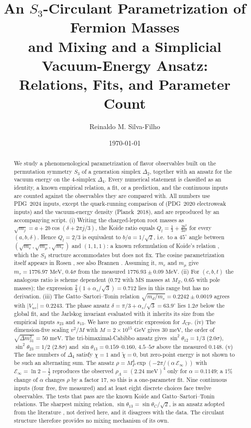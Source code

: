 \documentclass[11pt,reqno]{amsart}
\title[$S_3$-Circulant Flavor Parametrization: Relations, Fits, Parameter Count]{An $S_3$-Circulant Parametrization of Fermion Masses\\ and Mixing and a Simplicial Vacuum-Energy Ansatz:\\ Relations, Fits, and Parameter Count}
\author{Reinaldo M. Silva-Filho}
\date{\today}
\author@andify\authors
\theoremstyle{definition}
\begin{document}
\begin{abstract}
We study a phenomenological parametrization of flavor observables built on the permutation symmetry $S_3$ of a generation simplex $\Delta_2$, together with an ansatz for the vacuum energy on the 4-simplex $\Delta_4$. Every numerical statement is classified as an identity, a known empirical relation, a fit, or a prediction, and the continuous inputs are counted against the observables they are compared with. All numbers use PDG~2024 inputs, except the quark-running comparison of \cite{huang2021precise} (PDG~2020 electroweak inputs) and the vacuum-energy density (Planck~2018), and are reproduced by an accompanying script.
(i) Writing the charged-lepton root masses as $\sqrt{m_j} = a + 2b\cos(\delta + 2\pi j/3)$, the Koide ratio equals $Q_l = \frac13 + \frac{2b^2}{3a^2}$ for every $(a,b,\delta)$. Hence $Q_l = 2/3$ is equivalent to $b/a = 1/\sqrt2$, i.e.\ to a $45^\circ$ angle between $(\sqrt{m_e},\sqrt{m_\mu},\sqrt{m_\tau})$ and $(1,1,1)$: a known reformulation of Koide's relation \cite{foot1994note}, which the $S_3$ structure accommodates but does not fix. The cosine parametrization itself appears in Rosen \cite{rosen2007heuristic}, see also Brannen \cite{brannen2010spin}. Assuming it, $m_e$ and $m_\mu$ give $m_\tau = 1776.97\text{ MeV}$, $0.4\sigma$ from the measured $1776.93 \pm 0.09\text{ MeV}$.
(ii) For $(c,b,t)$ the analogous ratio is scheme dependent ($0.72$ with $\overline{\mathrm{MS}}$ masses at $M_Z$, $0.65$ with pole masses); the expression $\frac23(1+\alpha_s/\sqrt3) = 0.712$ lies in this range but has no derivation.
(iii) The Gatto--Sartori--Tonin relation $\sqrt{m_d/m_s} = 0.2242 \pm 0.0019$ agrees with $|V_{us}| = 0.2243$. The phase ansatz $\delta = \pi/3 + \alpha_s/\sqrt3 = 63.9^\circ$ lies $1.2\sigma$ below the global fit, and the Jarlskog invariant evaluated with it inherits its size from the empirical inputs $s_{23}$ and $s_{13}$. We have no geometric expression for $J_{\mathrm{CP}}$.
(iv) The dimension-five scaling $v^2/M$ with $M = 2\times10^{15}\text{ GeV}$ gives $30\text{ meV}$, the order of $\sqrt{\Delta m^2_{31}} = 50\text{ meV}$. The tri-bimaximal-Cabibbo ansatz gives $\sin^2\theta_{12} = 1/3$ ($2.0\sigma$), $\sin^2\theta_{23} = 1/2$ ($2.8\sigma$) and $\sin\theta_{13} = 0.159$--$0.160$, $4.5$--$5\sigma$ above the measured $0.148$.
(v) The face numbers of $\Delta_4$ satisfy $\chi = 1$ and $\tilde\chi = 0$, but zero-point energy is not shown to be such an alternating sum. The ansatz $\rho = M_P^4 \exp(-2\pi/(\alpha\,\mathcal{E}_\infty))$ with $\mathcal{E}_\infty = \ln 2 - \frac12$ reproduces the observed $\rho_\Lambda = (2.24\text{ meV})^4$ only for $\alpha = 0.1149$; a $1\%$ change of $\alpha$ changes $\rho$ by a factor $17$, so this is a one-parameter fit.
Nine continuous inputs (four free, five measured) and at least eight discrete choices face twelve observables. The tests that pass are the known Koide and Gatto--Sartori--Tonin relations. The sharpest mixing relation, $\sin\theta_{13} = \sin\theta_C/\sqrt2$, is an ansatz adopted from the literature \cite{king2012tbc}, not derived here, and it disagrees with the data. The circulant structure therefore provides no mixing mechanism of its own.
\end{abstract}
\end{document}
